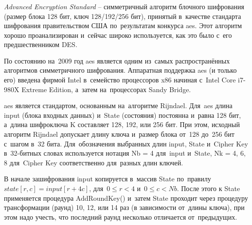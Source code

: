 \subsubsection{}
\label{sec:analysis:research:crypto:aes}

\emph{Advanced Encryption Standard} -- симметричный алгоритм блочного шифрования (размер блока 128 бит, ключ 128/192/256 бит), принятый в~качестве стандарта шифрования правительством США по~результатам конкурса \gls{aes}. Этот алгоритм хорошо проанализирован и~сейчас широко используется, как это было с~его предшественником DES\cite{wiki:aes}.

По состоянию на~2009 год \gls{aes} является одним из~самых распространённых алгоритмов симметричного шифрования\cite{thg:aes}. Аппаратная поддержка \gls{aes} (и только его) введена фирмой Intel в~семейство процессоров x86 начиная с~Intel Core i7-980X Extreme Edition, а~затем на~процессорах Sandy Bridge.

\gls{aes} является стандартом, основанным на~алгоритме Rijndael. Для~\gls{aes} длина input (блока входных данных) и~State (состояния) постоянна и~равна 128 бит, а~длина шифроключа K составляет 128, 192, или 256 бит. При этом, исходный алгоритм Rijndael допускает длину ключа и~размер блока от~128 до~256 бит с~шагом в~32 бита. Для~обозначения выбранных длин input, State и~Cipher Key в~32-битных словах используется нотация Nb = 4 для~input и~State, Nk = 4, 6, 8 для~Cipher Key соответственно для~разных длин ключей.

В начале зашифрования input копируется в~массив State по~правилу \(state[r,c]=input[r+4c]\), для~\(0 \leq r < 4\) и~\(0 \leq c < Nb\). После этого к State применяется процедура AddRoundKey() и~затем State проходит через процедуру трансформации (раунд) 10, 12, или 14 раз (в зависимости от~длины ключа), при этом надо учесть, что последний раунд несколько отличается от~предыдущих.